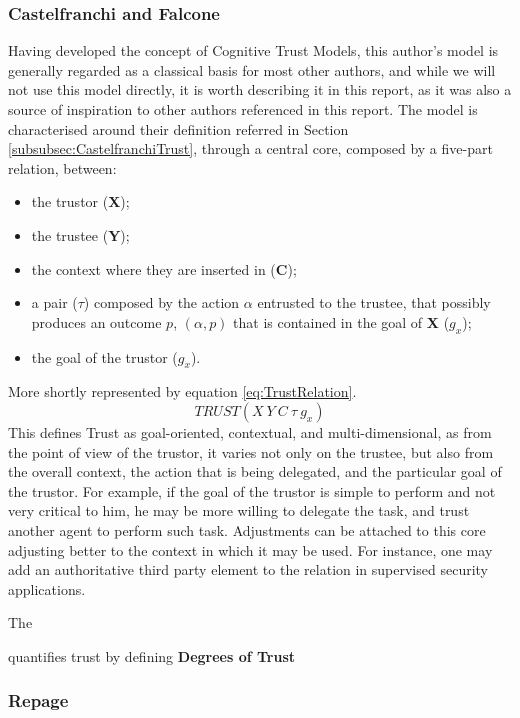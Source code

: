 \subsubsection{Castelfranchi and Falcone}
Having developed the concept of Cognitive Trust Models, this author's model is generally regarded as a classical basis for most other authors, and while we will not use this model directly, it is worth describing it in this report, as it was also a source of inspiration to other authors referenced in this report. 
The model is characterised around their definition referred in Section \ref{subsubsec:CastelfranchiTrust}, through a central core, composed by a five-part relation, between:
\begin{itemize}
	\item the trustor (\textbf{X});
	\item the trustee (\textbf{Y});
	\item the context where they are inserted in (\textbf{C});
	\item a pair ($\tau$) composed by the action $\alpha$ entrusted to the trustee, that possibly produces an outcome $p$, $(\alpha, p)$ that is contained in the goal of \textbf{X} ($g_x$);
	\item the goal of the trustor ($g_x$).
\end{itemize}
More shortly represented by equation \ref{eq:TrustRelation}.
\begin{equation}
TRUST(X\ Y\ C\ \tau\ g_x)
\label{eq:TrustRelation}
\end{equation}
This defines Trust as goal-oriented, contextual, and multi-dimensional, as from the point of view of the trustor, it varies not only on the trustee, but also from the overall context, the action that is being delegated, and the particular goal of the trustor. For example, if the goal of the trustor is simple to perform and not very critical to him, he may be more willing to delegate the task, and trust another agent to perform such task. Adjustments can be attached to this core adjusting better to the context in which it may be used. For instance, one may add an authoritative third party element to the relation in supervised security applications.

The 

 quantifies trust by defining \textbf{Degrees of Trust} 


\subsubsection{Repage}


